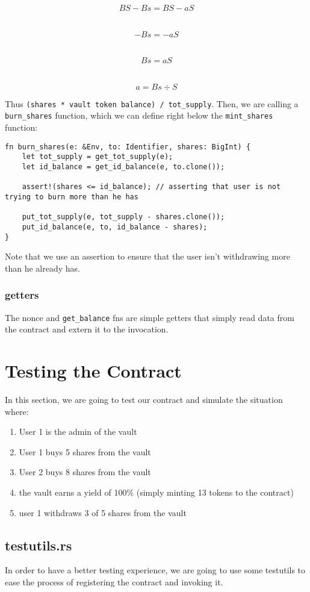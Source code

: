 \documentclass{article}
\newcommand{\inl}[1]{\lstinline{#1}}
\begin{document}
\[ BS - Bs = BS - aS \]
\

\[ - Bs = - aS \]
\

\[ Bs = aS \]
\

\[ a = Bs \div S \]

Thus \inl{(shares * vault token balance) / tot_supply}. Then, we are calling a \inl{burn_shares} function, which we can define right below the \inl{mint_shares} function:

\begin{lstlisting}
fn burn_shares(e: &Env, to: Identifier, shares: BigInt) {
    let tot_supply = get_tot_supply(e);
    let id_balance = get_id_balance(e, to.clone());

    assert!(shares <= id_balance); // asserting that user is not trying to burn more than he has

    put_tot_supply(e, tot_supply - shares.clone());
    put_id_balance(e, to, id_balance - shares);
}

\end{lstlisting}

Note that we use an assertion to ensure that the user isn't withdrawing more than he already has.

\subsubsection{getters}
The nonce and \inl{get_balance} fns are simple getters that simply read data from the contract and extern it to the invocation.

\section{Testing the Contract}
In this section, we are going to test our contract and simulate the situation where:
\begin{enumerate}
\item User 1 is the admin of the vault
\item User 1 buys 5 shares from the vault
\item User 2 buys 8 shares from the vault
\item the vault earns a yield of 100\% (simply minting 13 tokens to the contract)
\item user 1 withdraws 3 of 5 shares from the vault
\end{enumerate}

\subsection{testutils.rs}
In order to have a better testing experience, we are going to use some testutils to ease the process of registering the contract and invoking it.
\end{document}
